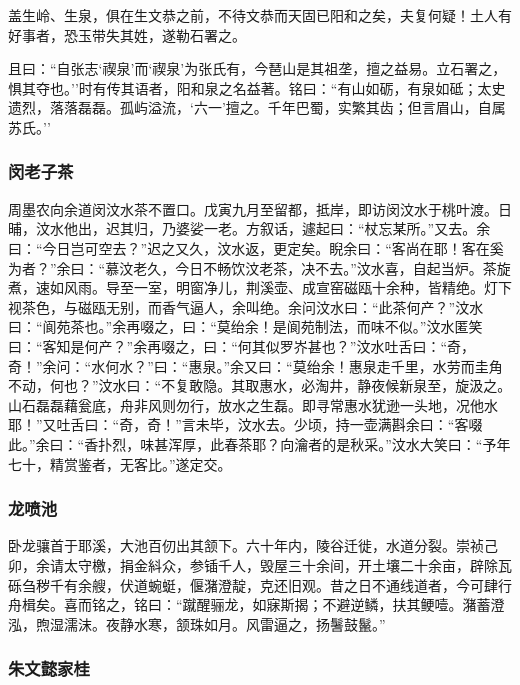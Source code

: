 \documentclass[]{article}
\begin{document}
盖生岭、生泉，俱在生文恭之前，不待文恭而天固已阳和之矣，夫复何疑！土人有好事者，恐玉带失其姓，遂勒石署之。

且曰：``自张志`禊泉'而`禊泉'为张氏有，今琶山是其祖垄，擅之益易。立石署之，惧其夺也。''时有传其语者，阳和泉之名益著。铭曰：``有山如砺，有泉如砥；太史遗烈，落落磊磊。孤屿溢流，`六一'擅之。千年巴蜀，实繁其齿；但言眉山，自属苏氏。''

\hypertarget{header-n224}{%
\subsubsection{闵老子茶}\label{header-n224}}

周墨农向余道闵汶水茶不置口。戊寅九月至留都，抵岸，即访闵汶水于桃叶渡。日晡，汶水他出，迟其归，乃婆娑一老。方叙话，遽起曰：``杖忘某所。''又去。余曰：``今日岂可空去？''迟之又久，汶水返，更定矣。睨余曰：``客尚在耶！客在奚为者？''余曰：``慕汶老久，今日不畅饮汶老茶，决不去。''汶水喜，自起当炉。茶旋煮，速如风雨。导至一室，明窗净儿，荆溪壶、成宣窑磁瓯十余种，皆精绝。灯下视茶色，与磁瓯无别，而香气逼人，余叫绝。余问汶水曰：``此茶何产？''汶水曰：``阆苑茶也。''余再啜之，曰：``莫绐余！是阆苑制法，而味不似。''汶水匿笑曰：``客知是何产？''余再啜之，曰：``何其似罗岕甚也？''汶水吐舌曰：``奇，奇！''余问：``水何水？''曰：``惠泉。''余又曰：``莫绐余！惠泉走千里，水劳而圭角不动，何也？''汶水曰：``不复敢隐。其取惠水，必淘井，静夜候新泉至，旋汲之。山石磊磊藉瓮底，舟非风则勿行，放水之生磊。即寻常惠水犹逊一头地，况他水耶！''又吐舌曰：``奇，奇！''言未毕，汶水去。少顷，持一壶满斟余曰：``客啜此。''余曰：``香扑烈，味甚浑厚，此春茶耶？向瀹者的是秋采。''汶水大笑曰：``予年七十，精赏鉴者，无客比。''遂定交。

\hypertarget{header-n229}{%
\subsubsection{龙喷池}\label{header-n229}}

卧龙骧首于耶溪，大池百仞出其颔下。六十年内，陵谷迁徙，水道分裂。崇祯己卯，余请太守檄，捐金紏众，参锸千人，毁屋三十余间，开土壤二十余亩，辟除瓦砾刍秽千有余艘，伏道蜿蜓，偃潴澄靛，克还旧观。昔之日不通线道者，今可肆行舟楫矣。喜而铭之，铭曰：``蹴醒骊龙，如寐斯揭；不避逆鳞，扶其鲠噎。潴蓄澄泓，煦湿濡沫。夜静水寒，颔珠如月。风雷逼之，扬鬐鼓鬣。''

\hypertarget{header-n234}{%
\subsubsection{朱文懿家桂}\label{header-n234}}
\end{document}
